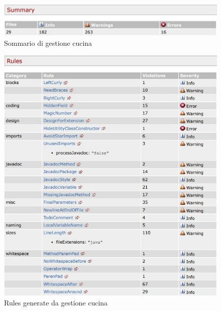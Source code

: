 \begin{figure}[htbp]
	\centering
	\includegraphics[scale=0.6]{iterazione1/images/Cs_Summary_Gestione_Cucina.jpg}
	\caption{Sommario di gestione cucina\label{fig:Cs_Summary_Gestione_Cucina}}
\end{figure}

\begin{figure}[htbp]
	\centering
	\includegraphics[scale=0.9]{iterazione1/images/Cs_rules_Gestione_Cucina.jpg}
	\caption{Rules generate da gestione cucina\label{fig:Cs_Rules_Gestione_Cucina}}
\end{figure}

